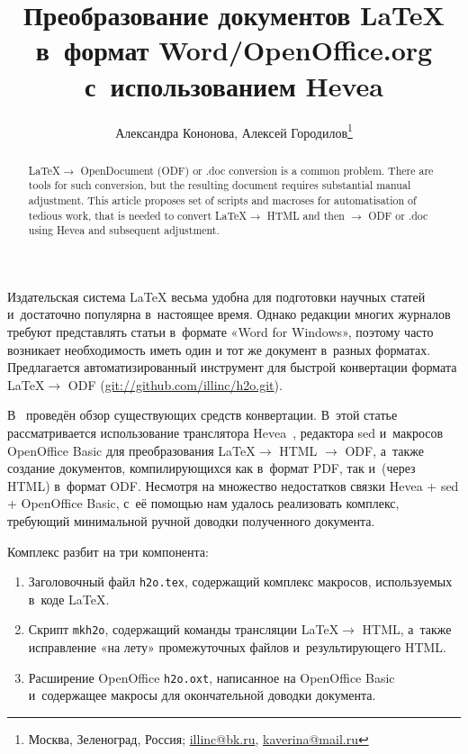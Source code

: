 \documentclass[10pt, a5paper]{article}
\begin{document}
\title{Преобразование документов \LaTeX{} в~формат Word/OpenOffice.org с~использованием Hevea}%

\author{Александра Кононова, Алексей Городилов\footnote{Москва, Зеленоград, Россия; \url{illinc@bk.ru}, \url{kaverina@mail.ru}}}
\maketitle

\begin{abstract}
\LaTeX $\to$ OpenDocument (ODF) or .doc conversion is a common problem. 
There are tools for such conversion, but the resulting document requires 
substantial manual adjustment. This article proposes set of scripts and 
macroses for automatisation of tedious work, that is needed to convert 
\LaTeX $\to$ HTML and then $\to$ ODF or .doc  using Hevea and subsequent 
adjustment.
\end{abstract}

Издательская система \LaTeX{} весьма удобна для подготовки научных статей и~достаточно популярна в~настоящее время.
Однако редакции многих журналов требуют представлять статьи в~формате «Word for Windows»,
поэтому часто
возникает необходимость иметь один и тот же документ в~разных форматах.
Предлагается автоматизированный инструмент для быстрой конвертации формата \LaTeX $\to$ ODF (\url{git://github.com/illinc/h2o.git}).

В~\cite{h2o:virens:latex-word-openoffice} проведён обзор существующих средств конвертации.
В~этой статье рассматривается использование транслятора Hevea~\cite{h2o:hevea.inria.fr}, редактора sed и~макросов OpenOffice Basic для преобразования \LaTeX \linebreak $\to$ HTML $\to$ ODF, а~также создание документов, компилирующихся как в~формат PDF, так и~(через HTML) в~формат ODF.
Несмотря на множество недостатков связки Hevea + sed + OpenOffice Basic, с~её помощью нам удалось реализовать комплекс, требующий минимальной ручной доводки полученного документа.

Комплекс разбит на три компонента:
\begin{enumerate}
\item Заголовочный файл \verb!h2o.tex!, содержащий комплекс макросов, используемых в~коде \LaTeX.
\item Скрипт \verb!mkh2o!, содержащий команды трансляции \LaTeX $\to$ \linebreak HTML, а~также исправление «на лету» промежуточных файлов и~результирующего HTML.
\item Расширение OpenOffice \verb!h2o.oxt!, написанное на OpenOffice \linebreak Basic и~содержащее макросы для окончательной доводки документа.
\end{enumerate}
\end{document}
